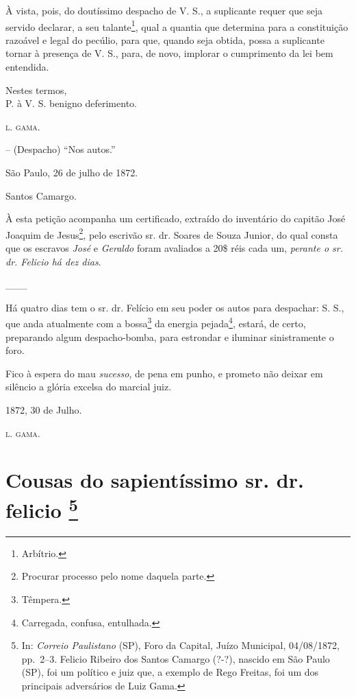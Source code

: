 À vista, pois, do doutíssimo despacho de V. S., a suplicante requer que
seja servido declarar, a seu talante\footnote{ Arbítrio.}, qual a
quantia que determina para a constituição razoável e legal do pecúlio,
para que, quando seja obtida, possa a suplicante tornar à presença de V.
S., para, de novo, implorar o cumprimento da lei bem entendida.

Nestes termos,\\
P. à V. S. benigno deferimento.

\textsc{l. gama}.

-- (Despacho) ``Nos autos.''

São Paulo, 26 de julho de 1872.

Santos Camargo.

À esta petição acompanha um certificado, extraído do inventário do
capitão José Joaquim de Jesus\footnote{ Procurar processo pelo nome
  daquela parte.}, pelo escrivão sr. dr. Soares de Souza Junior, do qual
consta que os escravos \emph{José} e \emph{Geraldo} foram avaliados a
20\$ réis cada um, \emph{perante o sr. dr. Felicio há dez dias}.

\_\_\_

Há quatro dias tem o sr. dr. Felício em seu poder os autos para
despachar: S. S., que anda atualmente com a bossa\footnote{ Têmpera.}
da energia pejada\footnote{ Carregada, confusa, entulhada.}, estará, de
certo, preparando algum despacho-bomba, para estrondar e iluminar
sinistramente o foro.

Fico à espera do mau \emph{sucesso}, de pena em punho, e prometo não
deixar em silêncio a glória excelsa do marcial juiz.

1872, 30 de Julho.

\textsc{l. gama}.

\chapter{Cousas do sapientíssimo sr. dr. felicio
\footnote{ In: \emph{Correio Paulistano} (SP), Foro da Capital, Juízo
  Municipal, 04/08/1872, pp.~2--3. Felicio Ribeiro dos Santos Camargo
  (?-?), nascido em São Paulo (SP), foi um político e juiz que, a
  exemplo de Rego Freitas, foi um dos principais adversários de Luiz
  Gama.}} %

